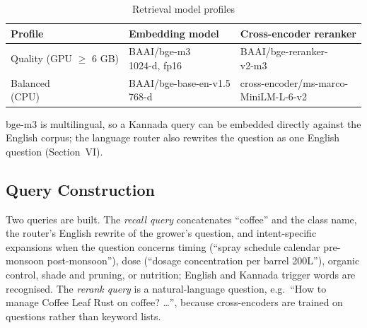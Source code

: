 \begin{table}[t]
\caption{Retrieval model profiles}
\label{tab:profiles}
\centering
\scriptsize
\setlength{\tabcolsep}{3pt}
\begin{tabular}{@{}lll@{}}
\toprule
Profile & Embedding model & Cross-encoder reranker \\
\midrule
\makecell[l]{Quality\\(GPU $\geq$ 6 GB)} & \makecell[l]{BAAI/bge-m3\\1024-d, fp16} & \makecell[l]{BAAI/bge-reranker-\\v2-m3} \\
\addlinespace
\makecell[l]{Balanced\\(CPU)} & \makecell[l]{BAAI/bge-base-en-v1.5\\768-d} & \makecell[l]{cross-encoder/ms-marco-\\MiniLM-L-6-v2} \\
\bottomrule
\end{tabular}
\end{table}

bge-m3 is multilingual, so a Kannada query can be embedded directly against the English corpus; the language router
also rewrites the question as one English question (Section~VI).

\subsection{Query Construction}
Two queries are built. The \emph{recall query} concatenates ``coffee'' and the class name, the router's English
rewrite of the grower's question, and intent-specific expansions when the question concerns timing (``spray schedule
calendar pre-monsoon post-monsoon''), dose (``dosage concentration per barrel 200L''), organic control, shade and
pruning, or nutrition; English and Kannada trigger words are recognised. The \emph{rerank query} is a natural-language
question, e.g.\ ``How to manage Coffee Leaf Rust on coffee? \ldots'', because cross-encoders are trained on questions
rather than keyword lists.

